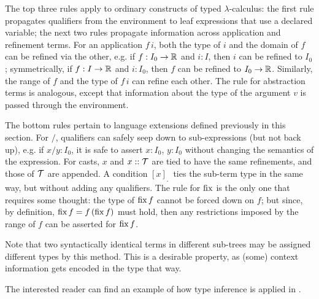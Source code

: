 \medskip
The top three rules apply to ordinary constructs of typed $\lambda$-calculus:
the first rule propagates qualifiers from the environment to leaf expressions that use a declared variable;
the next two rules propagate information across application and refinement terms.
For an application $f\,i$, both the type of $i$ and the domain of $f$ can be refined
via the other, e.g. if $f:I_0\to\mathbb{R}$ and $i:I$, then $i$ can be refined to $I_0$; 
symmetrically, if $f:I\to\mathbb{R}$ and $i:I_0$, then $f$ can be refined to $I_0\to\mathbb{R}$.
Similarly, the range of $f$ and the type of $f\,i$ can refine each other.
The rule for abstraction terms is analogous, except that information about the type
of the argument $v$ is passed through the environment.

The bottom rules pertain to language extensions defined previously in this section.
For $/$, qualifiers can safely seep down to sub-expressions (but not back up), e.g. if $x/y:I_0$,
it is safe to assert $x:I_0$, $y:I_0$ without changing the semantics of the expression.
For casts, $x$ and $x::\mathcal{T}$ are tied to have the same refinements, and those
of $\mathcal{T}$ are appended. 
A condition $[x]_{_\square}\,$ ties the sub-term type in the same way, but without
adding any qualifiers. The rule for $\operatorname{fix}$ is the only one that requires some thought:
the type of $\operatorname{fix} f$ cannot be forced down on $f$; but since, by definition, $\operatorname{fix} f = f\,(\operatorname{fix} f)$
must hold, then any restrictions imposed by the range of $f$ can be asserted for $\operatorname{fix} f$.

Note that two syntactically identical terms in different sub-trees may be assigned
different types by this method. This is a desirable property, as (some) context information
gets encoded in the type that way.

The interested reader can find an example of how type inference is applied in .

